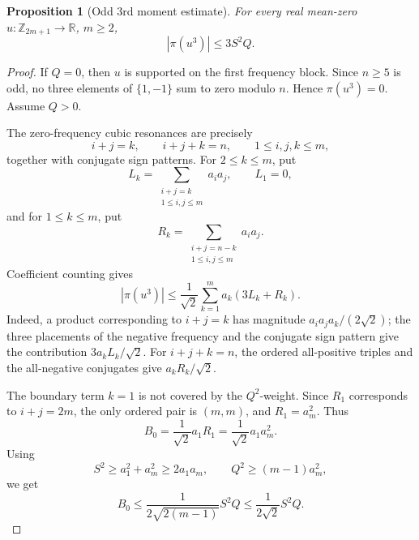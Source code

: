 \documentclass[11pt]{amsart}
\numberwithin{equation}{section}
\theoremstyle{plain}
\newtheorem{proposition}[theorem]{Proposition}
\theoremstyle{remark}
\newcommand{\RR}{\mathbb R}
\newcommand{\Zn}[1]{\mathbb Z_{#1}}
\newcommand{\Ssymbol}{S}
\newcommand{\Qsymbol}{Q}
\newcommand{\Ssq}{\Ssymbol^2}
\newcommand{\Qsq}{\Qsymbol^2}
\newcommand{\AvgSymbol}{\pi}
\newcommand{\Avg}[1]{\AvgSymbol\!\left(#1\right)}
\newcommand{\abs}[1]{\left|#1\right|}
\begin{document}
\begin{proposition}[Odd 3rd moment estimate]\label{thm:odd-block}
For every real mean-zero \(u:\Zn{2m+1}\to\RR\), \(m\ge2\),
\[
  \abs{\Avg{u^3}}
  \le 3\Ssq\Qsymbol.
\]
\end{proposition}

\begin{proof}
If \(\Qsymbol=0\), then \(u\) is supported on the first frequency block.  Since
\(n\ge5\) is odd, no three elements of \(\{1,-1\}\) sum to zero modulo
\(n\).  Hence \(\Avg{u^3}=0\).  Assume \(\Qsymbol>0\).

The zero-frequency cubic resonances are precisely
\[
  i+j=k,
  \qquad
  i+j+k=n,
  \qquad 1\le i,j,k\le m,
\]
together with conjugate sign patterns.  For \(2\le k\le m\), put
\[
  L_k=\sum_{\substack{i+j=k\\1\le i,j\le m}}a_i a_j,
  \qquad L_1=0,
\]
and for \(1\le k\le m\), put
\[
  R_k=\sum_{\substack{i+j=n-k\\1\le i,j\le m}}a_i a_j.
\]
Coefficient counting gives
\begin{equation}\label{eq:odd-resonance-bound}
  \abs{\Avg{u^3}}
  \le \frac1{\sqrt2}\sum_{k=1}^{m}a_k(3L_k+R_k).
\end{equation}
Indeed, a product corresponding to \(i+j=k\) has magnitude
\(a_i a_j a_k/(2\sqrt2)\); the three placements of the negative
frequency and the conjugate sign pattern give the contribution
\(3a_kL_k/\sqrt2\).  For \(i+j+k=n\), the ordered all-positive triples
and the all-negative conjugates give \(a_kR_k/\sqrt2\).

The boundary term \(k=1\) is not covered by the \(\Qsq\)-weight.  Since
\(R_1\) corresponds to \(i+j=2m\), the only ordered pair is \((m,m)\), and
\(R_1=a_m^2\).  Thus
\[
  B_0=\frac1{\sqrt2}a_1R_1
  =\frac1{\sqrt2}a_1a_m^2.
\]
Using
\[
  \Ssq\ge a_1^2+a_m^2\ge2a_1a_m,
  \qquad
  \Qsq\ge(m-1)a_m^2,
\]
we get
\begin{equation}\label{eq:odd-boundary}
  B_0\le \frac1{2\sqrt{2(m-1)}}\Ssq\Qsymbol
  \le \frac1{2\sqrt2}\Ssq\Qsymbol.
\end{equation}


\end{proof}
\end{document}
